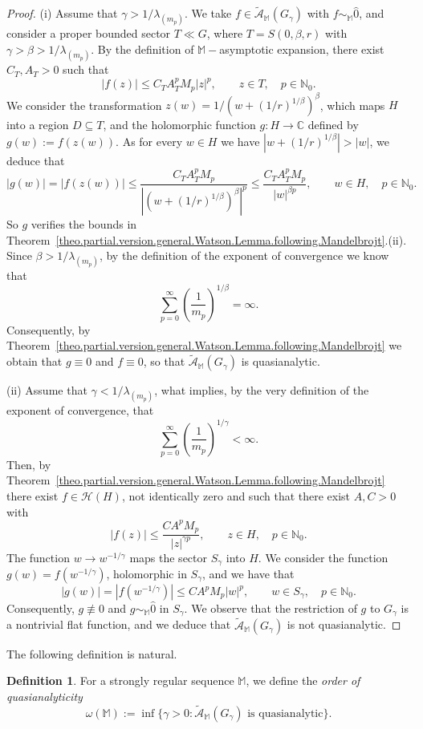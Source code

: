 \documentclass[11pt,a4paper]{article}
\theoremstyle{definition}
\newtheorem{defi}[theo]{Definition}
\def\oo{\infty}
\def\ri{\rightarrow}
\def\b{\beta}
\def\ga{\gamma}
\def\N{\mathbb{N}}
\def\C{\mathbb{C}}      %
\def\M{\mathbb{M}}
\begin{document}
\begin{proof}
(i) Assume that $\ga>1/\lambda_{(m_p)}$.  We take $f\in  \mathcal{\tilde{A}}_{\M}(G_\ga)$ with $f\sim_{\M} \hat{0}$, and consider a proper bounded sector $T\ll G$, where $T=S(0,\b,r)$ with $\ga>\b>1/\lambda_{(m_p)}$. By the definition of
$\M-$asymptotic expansion, there exist $C_T,A_T>0$ such that
$$|f(z)|\leq C_TA_T^p M_p |z|^p, \qquad z\in T, \quad p\in\N_0.$$
We consider the transformation $z(w)=1/(w+(1/r)^{1/\b})^\b$, which maps $H$ into a region $D\subseteq T$, and the holomorphic function
$g:H\ri\C$ defined by $g(w):=f(z(w))$. As for every $w\in H$ we have $|w+(1/r)^{1/\b}|>|w|$, we deduce that
$$|g(w)|=|f(z(w))|\leq \frac{C_TA_T^p M_p}{|(w+(1/r)^{1/\b})^\b|^p}\leq \frac{C_TA_T^p M_p}{|w|^{\b p}}, \qquad w\in H, \quad p\in \N_0.$$
So $g$ verifies the bounds in Theorem~\ref{theo.partial.version.general.Watson.Lemma.following.Mandelbrojt}.(ii). Since $\b>1/\lambda_{(m_p)}$,
by the definition of the exponent of convergence we know that
$$ \sum_{p=0}^{\oo} \left(\frac{1}{m_p} \right)^{1/\b}=\oo.$$
Consequently, by Theorem~\ref{theo.partial.version.general.Watson.Lemma.following.Mandelbrojt} we obtain that $g\equiv0$ and $f\equiv0$, so that  $\mathcal{\tilde{A}}_{\M}(G_\ga)$ is quasianalytic.

\noindent (ii) Assume that $\ga<1/\lambda_{(m_p)}$, what implies, by the very definition of the exponent of convergence, that
$$ \sum_{p=0}^{\oo} \left(\frac{1}{m_p} \right)^{1/\ga}<\oo.$$
Then, by Theorem~\ref{theo.partial.version.general.Watson.Lemma.following.Mandelbrojt} there exist
$f\in \mathcal{H}(H)$, not identically zero and such that there exist $A,C>0$ with
$$|f(z)|\leq \frac{CA^p M_p}{|z|^{\ga p}}, \qquad z\in H, \quad p\in \N_0.$$
The function $w\to w^{-1/\ga}$ maps the sector $S_\ga$ into $H$. We consider the function $g(w)=f(w^{-1/\ga})$, holomorphic in $S_\ga$, and
we have that
$$|g(w)|=|f(w^{-1/\ga})|\leq C A^p M_p |w|^p, \qquad w\in S_\ga, \quad p\in \N_0.$$
Consequently, $g\not\equiv 0$ and  $g\sim_{\M} \hat{0}$ in $S_\ga$. We observe that the restriction of $g$ to $G_\ga$ is a nontrivial flat function,
and we deduce that $\mathcal{\tilde{A}}_{\M}(G_\ga)$ is not quasianalytic.
\end{proof}

The following definition is natural.


\begin{defi}%
For a strongly regular sequence $\M$, we define the \textit{order of quasianalyticity}
$$\omega(\M):=\inf \{\ga>0:\mathcal{\tilde{A}}_{\M}(G_{\gamma}) \textrm{ is quasianalytic}\}.
$$
\end{defi}
\end{document}
